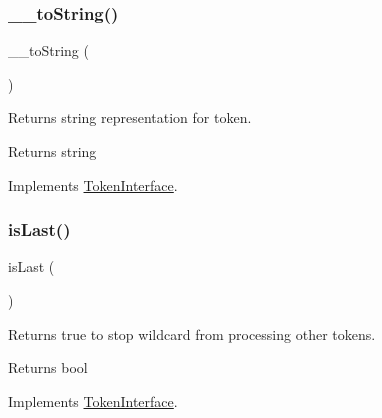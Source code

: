 \subsubsection{\texorpdfstring{\+\_\+\+\_\+to\+String()}{\_\_toString()}}
{\footnotesize\ttfamily \+\_\+\+\_\+to\+String (\begin{DoxyParamCaption}{ }\end{DoxyParamCaption})}

Returns string representation for token.

\begin{DoxyReturn}{Returns}
string 
\end{DoxyReturn}


Implements \mbox{\hyperlink{interface_prophecy_1_1_argument_1_1_token_1_1_token_interface_a7516ca30af0db3cdbf9a7739b48ce91d}{Token\+Interface}}.

\mbox{\label{class_prophecy_1_1_argument_1_1_token_1_1_any_values_token_ac72b8349b1340887fc1af30eca2b951c}} 
\subsubsection{\texorpdfstring{is\+Last()}{isLast()}}
{\footnotesize\ttfamily is\+Last (\begin{DoxyParamCaption}{ }\end{DoxyParamCaption})}

Returns true to stop wildcard from processing other tokens.

\begin{DoxyReturn}{Returns}
bool 
\end{DoxyReturn}


Implements \mbox{\hyperlink{interface_prophecy_1_1_argument_1_1_token_1_1_token_interface_ac72b8349b1340887fc1af30eca2b951c}{Token\+Interface}}.

\mbox{\label{class_prophecy_1_1_argument_1_1_token_1_1_any_values_token_a8d5bf47ab6eaa935458d5ad160e52822}} 
